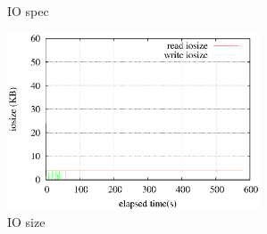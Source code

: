 \documentclass[11pt,a4paper]{jsarticle}
\newlength{\subfigwidth}
\newlength{\subfigcolsep}
\begin{document}
\begin{figure}[thbp]
 \setlength{\subfigwidth}{.5\linewidth}
 \addtolength{\subfigwidth}{-.5\subfigcolsep}
 \begin{minipage}[b]{\subfigwidth}
 \end{minipage}
  \begin{minipage}[b]{\subfigwidth}
  \end{minipage}
  \caption{IO spec}
  \label{fig:1idxra0}
\end{figure}

\begin{figure}[thbp]
 \begin{center}
  \includegraphics[width=75mm]{1idxscan_ra0iosize.eps}
 \end{center}
 \caption{IO size}
 \label{fig:1idx0iosize}
\end{figure}
\end{document}
